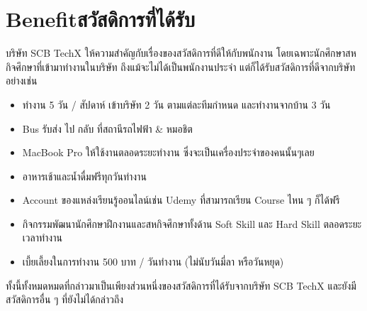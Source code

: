 \section{\ifenglish Benefit\else สวัสดิการที่ได้รับ\fi}
บริษัท SCB TechX ให้ความสำคัญกับเรื่องของสวัสดิการที่ดีให้กับพนักงาน โดยเฉพาะนักศึกษาสหกิจศึกษาที่เข้ามาทำงานในบริษัท
ถึงแม้จะไม่ได้เป็นพนักงานประจำ แต่ก็ได้รับสวัสดิการที่ดีจากบริษัทอย่างเช่น
\begin{itemize}
      \item ทำงาน 5 วัน / สัปดาห์ เข้าบริษัท 2 วัน ตามแต่ละทีมกำหนด และทำงานจากบ้าน 3 วัน
      \item Bus รับส่ง ไป กลับ ที่สถานีรถไฟฟ้า \& หมอชิต
      \item MacBook Pro ให้ใช้งานตลอดระยะทำงาน ซึ่งจะเป็นเครื่องประจำของคนนั้นๆเลย
      \item อาหารเช้าและน้ำดื่มฟรีทุกวันทำงาน
      \item Account ของแหล่งเรียนรู้ออนไลน์เช่น Udemy ที่สามารถเรียน Course ไหน ๆ ก็ได้ฟรี
      \item กิจกรรมพัฒนานักศึกษาฝึกงานและสหกิจศึกษาทั้งด้าน Soft Skill และ Hard Skill ตลอดระยะเวลาทำงาน
      \item เบี้ยเลี้ยงในการทำงาน 500 บาท / วันทำงาน (ไม่นับวันมี่ลา หรือวันหยุด)
\end{itemize}
ทั้งนี้ทั้งหมดหมดที่กล่าวมาเป็นเพียงส่วนหนึ่งของสวัสดิการที่ได้รับจากบริษัท SCB TechX และยังมีสวัสดิการอื่น ๆ ที่ยังไม่ได้กล่าวถึง